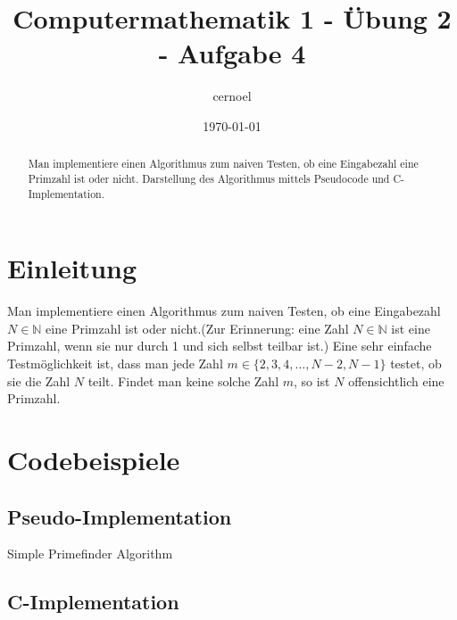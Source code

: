 \documentclass[a4paper,12pt,ngerman,oneside]{article}
\title{Computermathematik 1 - Übung 2 - Aufgabe 4}
\date{\today}
\author{cernoel}
\begin{document}
 
  \maketitle
  \begin{abstract}
    Man implementiere einen Algorithmus zum naiven Testen, ob eine Eingabezahl
    eine Primzahl ist oder nicht. Darstellung des Algorithmus mittels Pseudocode 
    und C-Implementation.
  \end{abstract}
  \newpage
  \tableofcontents 
  
  \newpage
  \section{Einleitung}
  Man implementiere einen Algorithmus zum naiven Testen, ob eine Eingabezahl 
  $N \in \mathbb{N}$ eine Primzahl ist oder nicht.(Zur Erinnerung: eine Zahl 
  $N \in \mathbb{N}$ ist eine Primzahl, wenn sie nur durch 1 und sich selbst 
  teilbar ist.) Eine sehr einfache Testmöglichkeit ist, dass man jede Zahl $m \in 
  \{ 2, 3, 4, ..., N - 2, N - 1 \}$ testet, ob sie die Zahl $N$ teilt. Findet man 
  keine solche Zahl $m$, so ist $N$ offensichtlich eine Primzahl.
  
  \newpage
  \section{Codebeispiele}
  \subsection{Pseudo-Implementation}
  \begin{algorithm}[H] %
    \SetAlgoLined %

  \caption{Simple Primefinder Algorithm}
  \end{algorithm}
  
  \newpage
  \subsection{C-Implementation}
  
\end{document}
